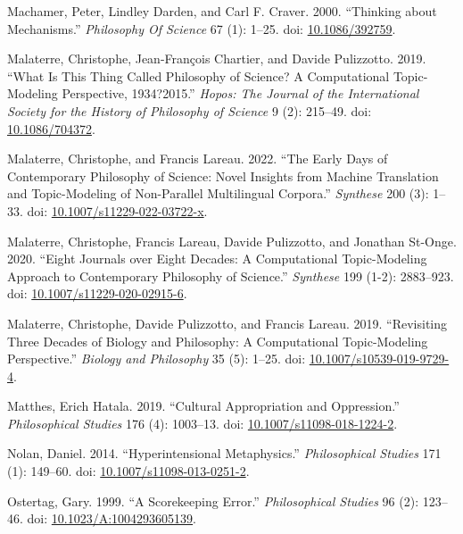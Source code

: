 \documentclass[
  10pt,
  letterpaper,
  DIV=11,
  numbers=noendperiod,
  twoside]{scrartcl}
\newlength{\cslhangindent}
\newenvironment{CSLReferences}[2] %
 {\begin{list}{}{%
  \setlength{\itemindent}{0pt}
  \setlength{\leftmargin}{0pt}
  \setlength{\parsep}{0pt}
  \ifodd #1
   \setlength{\leftmargin}{\cslhangindent}
   \setlength{\itemindent}{-1\cslhangindent}
  \fi
  \setlength{\itemsep}{#2\baselineskip}}}
 {\end{list}}
\begin{document}
\begin{CSLReferences}{1}{0}
Machamer, Peter, Lindley Darden, and Carl F. Craver. 2000. {``Thinking
about Mechanisms.''} \emph{Philosophy Of Science} 67 (1): 1--25. doi:
\href{https://doi.org/10.1086/392759}{10.1086/392759}.

Malaterre, Christophe, Jean-François Chartier, and Davide Pulizzotto.
2019. {``What Is This Thing Called Philosophy of Science? A
Computational Topic-Modeling Perspective, 1934?2015.''} \emph{Hopos: The
Journal of the International Society for the History of Philosophy of
Science} 9 (2): 215--49. doi:
\href{https://doi.org/10.1086/704372}{10.1086/704372}.

Malaterre, Christophe, and Francis Lareau. 2022. {``The Early Days of
Contemporary Philosophy of Science: Novel Insights from Machine
Translation and Topic-Modeling of Non-Parallel Multilingual Corpora.''}
\emph{Synthese} 200 (3): 1--33. doi:
\href{https://doi.org/10.1007/s11229-022-03722-x}{10.1007/s11229-022-03722-x}.

Malaterre, Christophe, Francis Lareau, Davide Pulizzotto, and Jonathan
St-Onge. 2020. {``Eight Journals over Eight Decades: A Computational
Topic-Modeling Approach to Contemporary Philosophy of Science.''}
\emph{Synthese} 199 (1-2): 2883--923. doi:
\href{https://doi.org/10.1007/s11229-020-02915-6}{10.1007/s11229-020-02915-6}.

Malaterre, Christophe, Davide Pulizzotto, and Francis Lareau. 2019.
{``Revisiting Three Decades of Biology and Philosophy: A Computational
Topic-Modeling Perspective.''} \emph{Biology and Philosophy} 35 (5):
1--25. doi:
\href{https://doi.org/10.1007/s10539-019-9729-4}{10.1007/s10539-019-9729-4}.

Matthes, Erich Hatala. 2019. {``Cultural Appropriation and
Oppression.''} \emph{Philosophical Studies} 176 (4): 1003--13. doi:
\href{https://doi.org/10.1007/s11098-018-1224-2}{10.1007/s11098-018-1224-2}.

Nolan, Daniel. 2014. {``Hyperintensional Metaphysics.''}
\emph{Philosophical Studies} 171 (1): 149--60. doi:
\href{https://doi.org/10.1007/s11098-013-0251-2}{10.1007/s11098-013-0251-2}.

Ostertag, Gary. 1999. {``A Scorekeeping Error.''} \emph{Philosophical
Studies} 96 (2): 123--46. doi:
\href{https://doi.org/10.1023/A:1004293605139}{10.1023/A:1004293605139}.


\end{CSLReferences}
\end{document}
